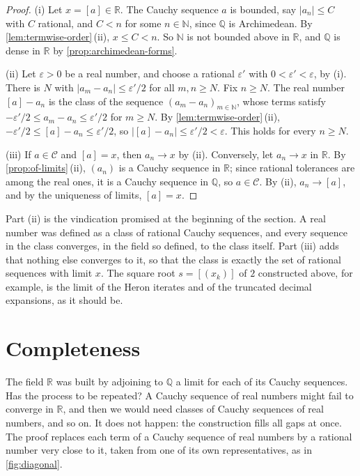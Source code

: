 \begin{proof}
(i) Let $x=[a]\in\mathbb R$. The Cauchy sequence $a$ is bounded, say $|a_n|\le C$ with $C$ rational, and $C<n$ for some $n\in\mathbb N$, since $\mathbb Q$ is Archimedean. By \cref{lem:termwise-order}\,(ii), $x\le C<n$. So $\mathbb N$ is not bounded above in $\mathbb R$, and $\mathbb Q$ is dense in $\mathbb R$ by \cref{prop:archimedean-forms}.

(ii) Let $\varepsilon>0$ be a real number, and choose a rational $\varepsilon'$ with $0<\varepsilon'<\varepsilon$, by (i). There is $N$ with $|a_m-a_n|\le\varepsilon'/2$ for all $m,n\ge N$. Fix $n\ge N$. The real number $[a]-a_n$ is the class of the sequence $(a_m-a_n)_{m\in\mathbb N}$, whose terms satisfy $-\varepsilon'/2\le a_m-a_n\le\varepsilon'/2$ for $m\ge N$. By \cref{lem:termwise-order}\,(ii), $-\varepsilon'/2\le[a]-a_n\le\varepsilon'/2$, so $\bigl|[a]-a_n\bigr|\le\varepsilon'/2<\varepsilon$. This holds for every $n\ge N$.

(iii) If $a\in\mathcal C$ and $[a]=x$, then $a_n\to x$ by (ii). Conversely, let $a_n\to x$ in $\mathbb R$. By \cref{prop:of-limits}\,(ii), $(a_n)$ is a Cauchy sequence in $\mathbb R$; since rational tolerances are among the real ones, it is a Cauchy sequence in $\mathbb Q$, so $a\in\mathcal C$. By (ii), $a_n\to[a]$, and by the uniqueness of limits, $[a]=x$.
\end{proof}

Part (ii) is the vindication promised at the beginning of the section. A real number was defined as a class of rational Cauchy sequences, and every sequence in the class converges, in the field so defined, to the class itself. Part (iii) adds that nothing else converges to it, so that the class is exactly the set of rational sequences with limit $x$. The square root $s=[(x_k)]$ of $2$ constructed above, for example, is the limit of the Heron iterates and of the truncated decimal expansions, as it should be.

\section{Completeness}
\label{sec:completeness-proof}

The field $\mathbb R$ was built by adjoining to $\mathbb Q$ a limit for each of its Cauchy sequences. Has the process to be repeated? A Cauchy sequence of real numbers might fail to converge in $\mathbb R$, and then we would need classes of Cauchy sequences of real numbers, and so on. It does not happen: the construction fills all gaps at once. The proof replaces each term of a Cauchy sequence of real numbers by a rational number very close to it, taken from one of its own representatives, as in \cref{fig:diagonal}.

